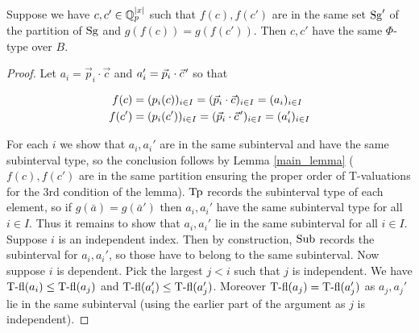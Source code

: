 \begin{Lemma}
  Suppose we have $c, c' \in \mathbb{Q}_p^{|x|}$ such that $f(c), f(c')$ are in the same
  set $\operatorname{Sg}'$ of the partition of $\operatorname{Sg}$ and $g(f(c)) = g(f(c'))$.
  Then $c, c'$ have the same $\Phi$-type over $B$.
\end{Lemma}

\newcommand{\pvec}[1]{\vec{#1}\mkern2mu\vphantom{#1}}

\begin{proof}
  Let $a_i = \vec p_i \cdot \vec c$ and $a_i' = \vec p_i \cdot \pvec c'$ so that

  \begin{align*}
    f(c) &= (p_i(c))_{i \in I} = (\vec p_i \cdot \vec c)_{i \in I} = (a_i)_{i \in I} \\
    f(c') &= (p_i(c'))_{i \in I} = (\vec p_i \cdot \pvec c')_{i \in I} = (a_i')_{i \in I}
  \end{align*}

  For each $i$ we show that $a_i, a_i'$ are in the same subinterval and have the same subinterval type, so the conclusion follows by Lemma \ref{main_lemma}
  ($f(c), f(c')$ are in the same partition ensuring the proper order of T-valuations for the 3rd condition of the lemma).
  $\operatorname{Tp}$ records the subinterval type of each element, so if $g(\bar a) = g(\bar a')$ then $a_i, a_i'$ have the same subinterval type for all $i \in I$.
  Thus it remains to show that $a_i, a_i'$ lie in the same subinterval for all $i \in I$.
  Suppose $i$ is an independent index.
  Then by construction, $\operatorname{Sub}$ records the subinterval for $a_i, a_i'$, so those have to belong to the same subinterval.
  Now suppose $i$ is dependent.
  Pick the largest $j < i$ such that $j$ is independent.
  We have $\operatorname{T-fl}(a_i) \leq \operatorname{T-fl}(a_j)$ and $\operatorname{T-fl}(a_i') \leq \operatorname{T-fl}(a_j')$.
  Moreover $\operatorname{T-fl}(a_j) = \operatorname{T-fl}(a_j')$ as $a_j, a_j'$ lie in the same subinterval (using the earlier part of the argument as $j$ is independent).
  

\end{proof}
